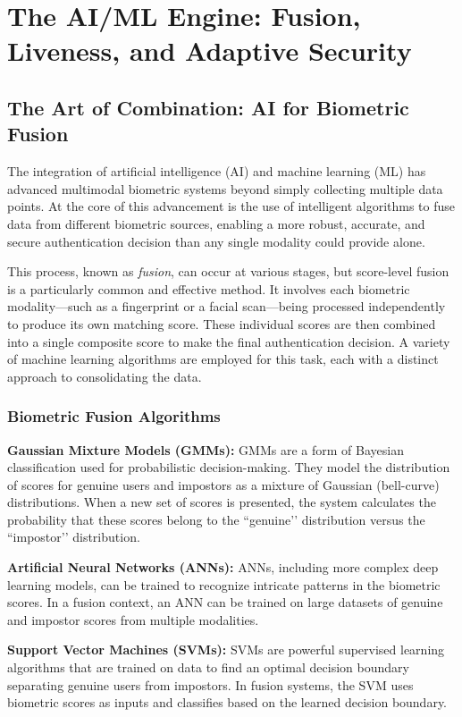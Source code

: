 \documentclass[12pt,a4paper]{report}
\begin{document}
\chapter{The AI/ML Engine: Fusion, Liveness, and Adaptive Security}

\section{The Art of Combination: AI for Biometric Fusion}

The integration of artificial intelligence (AI) and machine learning (ML) has advanced multimodal biometric systems beyond simply collecting multiple data points. At the core of this advancement is the use of intelligent algorithms to fuse data from different biometric sources, enabling a more robust, accurate, and secure authentication decision than any single modality could provide alone. 

This process, known as \textit{fusion}, can occur at various stages, but score-level fusion is a particularly common and effective method. It involves each biometric modality—such as a fingerprint or a facial scan—being processed independently to produce its own matching score. These individual scores are then combined into a single composite score to make the final authentication decision. A variety of machine learning algorithms are employed for this task, each with a distinct approach to consolidating the data.

\subsection{Biometric Fusion Algorithms}

\textbf{Gaussian Mixture Models (GMMs):} GMMs are a form of Bayesian classification used for probabilistic decision-making. They model the distribution of scores for genuine users and impostors as a mixture of Gaussian (bell-curve) distributions. When a new set of scores is presented, the system calculates the probability that these scores belong to the ``genuine’’ distribution versus the ``impostor’’ distribution. 

\textbf{Artificial Neural Networks (ANNs):} ANNs, including more complex deep learning models, can be trained to recognize intricate patterns in the biometric scores. In a fusion context, an ANN can be trained on large datasets of genuine and impostor scores from multiple modalities.

\textbf{Support Vector Machines (SVMs):} SVMs are powerful supervised learning algorithms that are trained on data to find an optimal decision boundary separating genuine users from impostors. In fusion systems, the SVM uses biometric scores as inputs and classifies based on the learned decision boundary.
\end{document}
